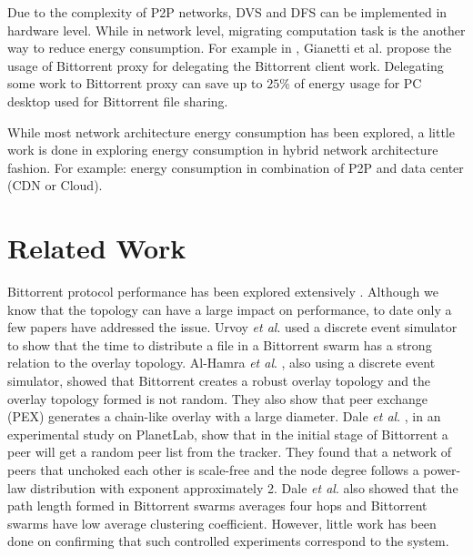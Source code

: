 Due to the complexity of P2P networks, DVS and DFS can be implemented in hardware level.  
While in network level, migrating computation task is the another way to reduce energy consumption.  
For example in \cite{6249349}, Gianetti et al. propose the usage of Bittorrent proxy for  delegating the Bittorrent client work. 
Delegating some work to Bittorrent proxy can save up to $25\%$ of energy usage for PC desktop used for Bittorrent file sharing.

While most network architecture energy consumption has been explored, a little work is done in exploring energy consumption in hybrid network architecture fashion. 
For example: energy consumption in combination of P2P and data center (CDN or Cloud).


\section{Related Work}

Bittorrent protocol performance has been explored extensively \cite{guo2005measurements}\cite{legout2006rarest}\cite{pouwelse2004measurement}\cite{tian2007modeling}\cite{li2010measurement}\cite{zhang2010bittorrent}.  
Although we know that the topology can have a large impact on performance, to date only a few papers have addressed the issue.
Urvoy \textit{et al}. \cite{urvoy2007impact} used a discrete event simulator to show that the time to distribute a file in a Bittorrent swarm has a strong relation to the overlay topology.  
Al-Hamra \textit{et al}. \cite{al2007understanding}, also using a discrete event simulator, showed that Bittorrent creates a robust overlay topology and the overlay topology formed is not random. 
They also show that peer exchange (PEX) generates a chain-like overlay with a large diameter. 
Dale \textit{et al}. \cite{dale2008evolution}, in an experimental study on PlanetLab, show that in the initial stage of Bittorrent a peer will get a random peer list from the tracker. 
They found that a network of peers that unchoked each other is scale-free and the node degree follows a power-law distribution with exponent approximately 2. 
Dale \textit{et al}. \cite{dale2008evolution} also showed that the path length formed in Bittorrent swarms averages four hops and Bittorrent swarms have low average clustering coefficient.  
However, little work has been done on confirming that such controlled experiments correspond to the system. %

